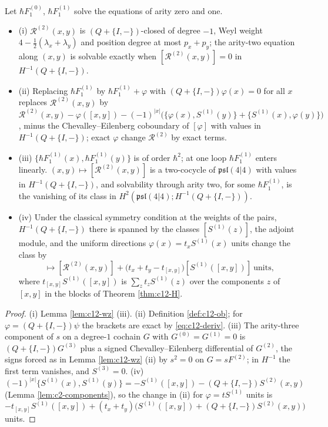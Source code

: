 \begin{theorem}
\label{thm:c12-eq2}
Let $\hbar F_1^{(0)}$, $\hbar F_1^{(1)}$ solve the equations of arity zero and one.
\begin{itemize}
\item (i) $\mathcal R^{(2)}(x,y)$ is $(Q+\{I,-\})$-closed of degree $-1$, Weyl weight $4-\tfrac12(\lambda_x+\lambda_y)$ and position degree at most $p_x+p_y$; the arity-two equation along $(x,y)$ is solvable exactly when $[\mathcal R^{(2)}(x,y)]=0$ in $H^{-1}(Q+\{I,-\})$.
\item (ii) Replacing $\hbar F_1^{(1)}$ by $\hbar F_1^{(1)}+\varphi$ with $(Q+\{I,-\})\varphi(x)=0$ for all $x$ replaces $\mathcal R^{(2)}(x,y)$ by $\mathcal R^{(2)}(x,y)-\varphi([x,y])-(-1)^{|x|}\big(\{\varphi(x),S^{(1)}(y)\}+\{S^{(1)}(x),\varphi(y)\}\big)$, minus the Chevalley--Eilenberg coboundary of $[\varphi]$ with values in $H^{-1}(Q+\{I,-\})$; exact $\varphi$ change $\mathcal R^{(2)}$ by exact terms.
\item (iii) $\{\hbar F_1^{(1)}(x),\hbar F_1^{(1)}(y)\}$ is of order $\hbar^2$; at one loop $\hbar F_1^{(1)}$ enters linearly. $(x,y)\mapsto[\mathcal R^{(2)}(x,y)]$ is a two-cocycle of $\mathfrak{psl}(4|4)$ with values in $H^{-1}(Q+\{I,-\})$, and solvability through arity two, for some $\hbar F_1^{(1)}$, is the vanishing of its class in $H^2(\mathfrak{psl}(4|4);H^{-1}(Q+\{I,-\}))$.
\item (iv) Under the classical symmetry condition at the weights of the pairs, $H^{-1}(Q+\{I,-\})$ there is spanned by the classes $[S^{(1)}(z)]$, the adjoint module, and the uniform directions $\varphi(x)=t_xS^{(1)}(x)$ units change the class by
\begin{equation}
[\mathcal R^{(2)}(x,y)]\longmapsto[\mathcal R^{(2)}(x,y)]+\big(t_x+t_y-t_{[x,y]}\big)[S^{(1)}([x,y])]\ \text{units},
\label{eq:c12-tshift}
\end{equation}
where $t_{[x,y]}S^{(1)}([x,y])$ is $\sum_zt_zS^{(1)}(z)$ over the components $z$ of $[x,y]$ in the blocks of Theorem \ref{thm:c12-H}.
\end{itemize}
\end{theorem}

\begin{proof}
(i) Lemma \ref{lem:c12-wz} (iii). (ii) Definition \ref{def:c12-ob}; for $\varphi=(Q+\{I,-\})\psi$ the brackets are exact by \eqref{eq:c12-deriv}. (iii) The arity-three component of $s$ on a degree-$1$ cochain $G$ with $G^{(0)}=G^{(1)}=0$ is $(Q+\{I,-\})G^{(3)}$ plus a signed Chevalley--Eilenberg differential of $G^{(2)}$, the signs forced as in Lemma \ref{lem:c12-wz} (ii) by $s^2=0$ on $G=sF^{(2)}$; in $H^{-1}$ the first term vanishes, and $S^{(3)}=0$. (iv) $(-1)^{|x|}\{S^{(1)}(x),S^{(1)}(y)\}=-S^{(1)}([x,y])-(Q+\{I,-\})S^{(2)}(x,y)$ (Lemma \ref{lem:c2-components}), so the change in (ii) for $\varphi=tS^{(1)}$ units is $-t_{[x,y]}S^{(1)}([x,y])+(t_x+t_y)\big(S^{(1)}([x,y])+(Q+\{I,-\})S^{(2)}(x,y)\big)$ units.
\end{proof}

